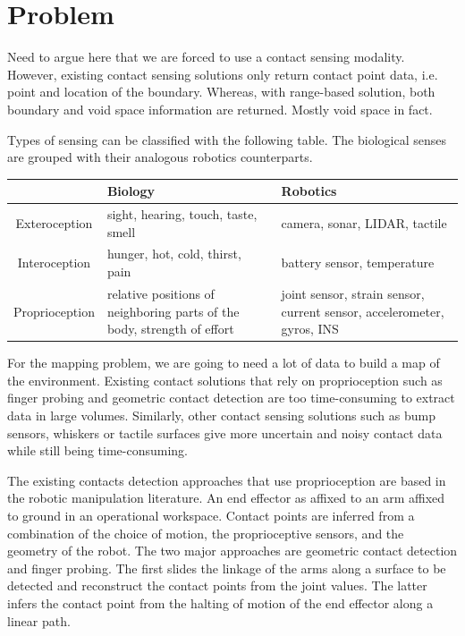 \section{Problem}
\label{sensing:problem}

Need to argue here that we are forced to use a contact sensing modality. However, existing contact sensing solutions only return contact point data, i.e. point and location of the boundary. Whereas, with range-based solution, both boundary and void space information are returned. Mostly void space in fact.

Types of sensing can be classified with the following table. The biological senses are grouped with their analogous robotics counterparts.



\begin{center}
    \begin{tabular}{| c | p{5cm} | p{5cm} |}
    \hline
        & Biology   & Robotics \\ \hline
    Exteroception & sight, hearing, touch, taste, smell & camera, sonar, LIDAR, tactile \\ \hline
    Interoception & hunger, hot, cold, thirst, pain & battery sensor, temperature \\ \hline
    Proprioception & relative positions of neighboring parts of the body, strength of effort & joint sensor, strain sensor, current sensor, accelerometer, gyros, INS \\ \hline
    \end{tabular}
\end{center}


For the mapping problem, we are going to need a lot of data to build a map of the environment. Existing contact solutions that rely on proprioception such as finger probing and geometric contact detection are too time-consuming to extract data in large volumes. Similarly, other contact sensing solutions such as bump sensors, whiskers or tactile surfaces give more uncertain and noisy contact data while still being time-consuming.

The existing contacts detection approaches that use proprioception are based in the robotic manipulation literature. An end effector as affixed to an arm affixed to ground in an operational workspace. Contact points are inferred from a combination of the choice of motion, the proprioceptive sensors, and the geometry of the robot. The two major approaches are geometric contact detection and finger probing. The first slides the linkage of the arms along a surface to be detected and reconstruct the contact points from the joint values. The latter infers the contact point from the halting of motion of the end effector along a linear path.

